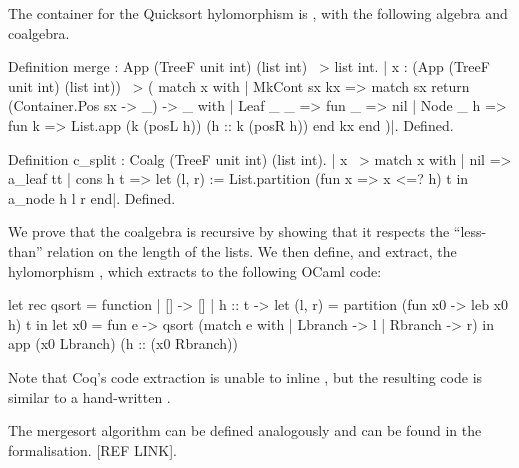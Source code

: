 \documentclass[ a4paper, UKenglish, cleveref, autoref, thm-restate]{lipics-v2021}
\begin{document}
The container for the Quicksort hylomorphism is , with
the following algebra and coalgebra.
\begin{coqcode}
  Definition merge : App (TreeF unit int) (list int) ~> list int.
|{ x : (App (TreeF unit int) (list int)) ~> (
           match x with
           | MkCont sx kx =>
               match sx return (Container.Pos sx -> _) -> _ with
               | Leaf _ _ => fun _ => nil
               | Node _ h => fun k => List.app (k (posL h)) (h :: k (posR h))
               end kx
           end
  )}|.
Defined.

Definition c_split : Coalg (TreeF unit int) (list int).
|{ x ~> match x with
        | nil => a_leaf tt
        | cons h t => let (l, r) := List.partition (fun x => x <=? h) t in
                      a_node h l r
        end}|.
Defined.
\end{coqcode}
We prove that the coalgebra  is recursive by showing
that it respects the ``less-than'' relation on the length of the lists.
We then define, and extract, the hylomorphism , which
extracts to the following OCaml code:
\begin{ocamlcode}
let rec qsort = function
| [] -> [] | h :: t ->
  let (l, r) = partition (fun x0 -> leb x0 h) t in
  let x0 = fun e -> qsort (match e with | Lbranch -> l | Rbranch -> r) in
  app (x0 Lbranch) (h :: (x0 Rbranch))
\end{ocamlcode}
Note that Coq's code extraction is unable to inline , but the resulting
code is similar to a hand-written .

The mergesort algorithm can be defined analogously and can be found in the formalisation. [REF LINK].


\end{document}
